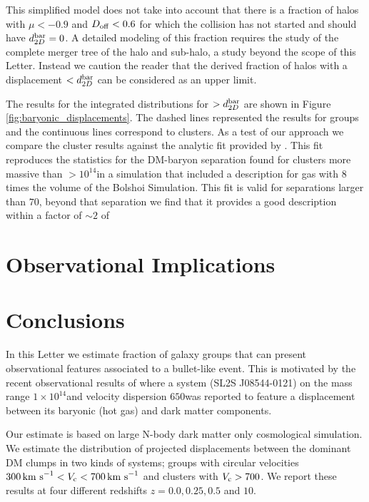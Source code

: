 \documentclass{emulateapj}
\newcommand{\hkpc}{{\ifmmode{h^{-1}{\rm kpc}}\else{$h^{-1}$kpc }\fi}}
\newcommand{\hMsun}{{\ifmmode{h^{-1}{\rm {M_{\odot}}}}\else{$h^{-1}{\rm{M_{\odot}}}$}\fi}}
\newcommand{\kms}{{\ifmmode{{\mathrm{\,km\ s}^{-1}}}\else{\,km~s$^{-1}$}\fi}}
\newcommand{\bullg}{SL2S J08544-0121}
\begin{document}
This simplified model does not take into account that there is a
fraction of halos with $\mu<-0.9$ and $D_{\rm off}<0.6$ for which the
collision has not started and should have $d_{2D}^{\rm bar}=0$. A detailed
modeling of this fraction requires the study of the complete merger
tree of the halo and sub-halo, a study beyond the scope of this
Letter. Instead we caution the reader that the derived fraction of
halos with a displacement $<d_{2D}^{\rm bar}$ can be considered as an
upper limit. 

The results for the integrated distributions for $>d_{2D}^{\rm bar}$
are shown in Figure \ref{fig:baryonic_displacements}. The dashed lines
represented the results for groups and the continuous lines correspond
to clusters. As a test of our approach we compare the cluster results
against the analytic fit provided by \cite{ForeroRomero2010}. This fit
reproduces the statistics for the DM-baryon separation found for
clusters more massive than $>10^{14}$\hMsun in a simulation
that included a description for gas with $8$ times the volume of the
Bolshoi Simulation. This fit is valid for separations larger than
$70$\hkpc, beyond that separation we find that it provides a good
description within a factor of $\sim 2$ of  




\section{Observational Implications}
\label{sec:observations}


\section{Conclusions}
\label{sec:conclusions}

In this Letter we estimate fraction of galaxy groups
that can present observational features associated to a
bullet-like event. This is motivated by the recent observational
results of \citep{Gastaldello} where a system (\bullg) on the mass range
$1\times 10^{14}$\hMsun and velocity dispersion $650$\kms was reported
to feature a displacement between its baryonic (hot gas) and dark
matter components. 

Our estimate is based on large N-body dark matter only cosmological
simulation. We estimate the distribution of projected displacements
between the dominant DM clumps in two kinds of systems; groups with
circular velocities $300\kms<V_{\rm c}<700\kms$ and clusters with $V_{\rm
  c}>700$\kms. We report these results at four different redshifts
$z=0.0,0.25,0.5$ and $10$.
\end{document}
